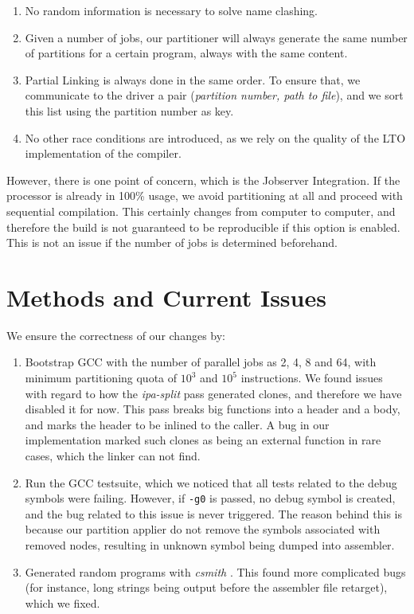 \documentclass[runningheads]{llncs}
\begin{document}
\begin{enumerate}
	\item No random information is necessary to solve name clashing.
	\item Given a number of jobs, our partitioner will always generate
	the same number of partitions for a certain program, always with the same content.
	\item Partial Linking is always done in the same order. To ensure that,
	we communicate to the driver a pair (\textit{partition number, path to file}),
	and we sort this list using the partition number as key.
	\item No other race conditions are introduced, as we rely on the quality of
	the LTO implementation of the compiler.
\end{enumerate}

However, there is one point of concern, which is the Jobserver Integration.  If
the processor is already in 100\% usage, we avoid partitioning at all and
proceed with sequential compilation. This certainly changes from computer to
computer, and therefore the build is not guaranteed to be reproducible if this
option is enabled. This is not an issue if the number of jobs is determined
beforehand.

\section{Methods and Current Issues}\label{sec:methods}

We ensure the correctness of our changes by:
\begin{enumerate}
	\item Bootstrap GCC with the number of parallel jobs as 2, 4, 8 and 64, with
	minimum partitioning quota of $10^3$ and $10^5$ instructions. We found issues
	with regard to how the \textit{ipa-split} pass generated clones, and therefore
	we have disabled it for now. This pass breaks big functions
	into a header and a body, and marks the header to be inlined to the caller.
	A bug in our implementation marked such clones as being an external function in
	rare cases, which the linker can not find.

	\item Run the GCC testsuite, which we noticed that all tests related to the debug
	symbols were failing. However, if \texttt{-g0} is passed, no debug symbol is created,
	and the bug related to this issue is never triggered. The reason behind this is
	because our partition applier do not remove the symbols associated with removed
	nodes, resulting in unknown symbol being dumped into assembler.

	\item Generated random programs with \textit{csmith} \cite{yang2011finding}. This found more complicated
	bugs (for instance, long strings being output before the assembler file retarget),
	which we fixed.
\end{enumerate}
\end{document}

